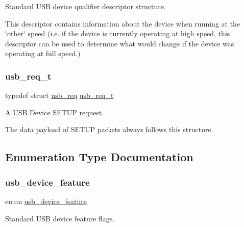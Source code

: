 Standard U\+SB device qualifier descriptor structure. 

This descriptor contains information about the device when running at the \char`\"{}other\char`\"{} speed (i.\+e. if the device is currently operating at high speed, this descriptor can be used to determine what would change if the device was operating at full speed.) \mbox{\label{group__usb__protocol__group_ga2ddc25536c2d827e1ae8d78c479c6308}} 
\subsubsection{\texorpdfstring{usb\+\_\+req\+\_\+t}{usb\_req\_t}}
{\footnotesize\ttfamily typedef struct \hyperlink{structusb__req}{usb\+\_\+req}  \hyperlink{group__usb__protocol__group_ga2ddc25536c2d827e1ae8d78c479c6308}{usb\+\_\+req\+\_\+t}}



A U\+SB Device S\+E\+T\+UP request. 

The data payload of S\+E\+T\+UP packets always follows this structure. 

\subsection{Enumeration Type Documentation}
\mbox{\label{group__usb__protocol__group_gab9975b89ad7079085d0300eab037c3ac}} 
\subsubsection{\texorpdfstring{usb\+\_\+device\+\_\+feature}{usb\_device\_feature}}
{\footnotesize\ttfamily enum \hyperlink{group__usb__protocol__group_gab9975b89ad7079085d0300eab037c3ac}{usb\+\_\+device\+\_\+feature}}



Standard U\+SB device feature flags. 

